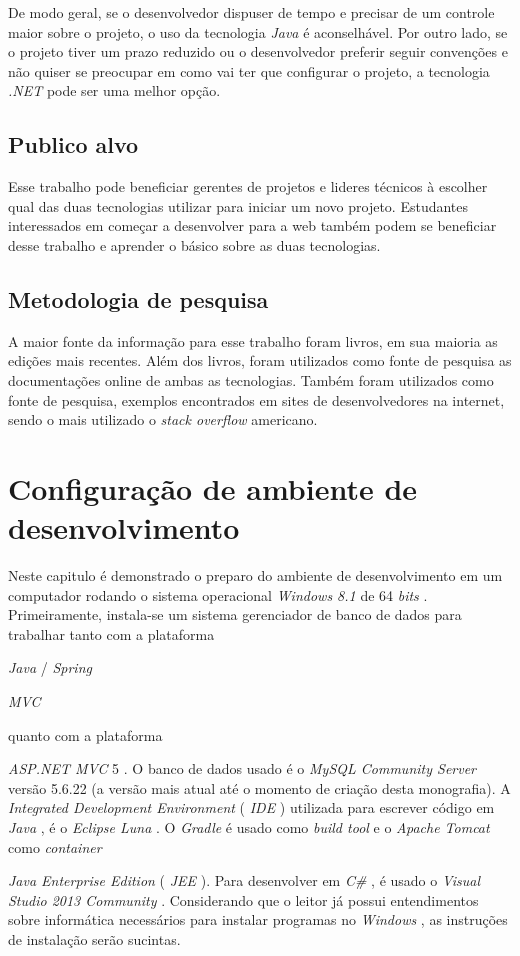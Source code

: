 \documentclass[a4paper,12pt]{article}
\newcommand{\anmvc} {
\sigla{ASP.NET MVC} 5
}
\newcommand{\spring} {
\lang{Java}/\est{Spring} \sigla{MVC}
}
\newcommand{\est}[1] {
	\textit{#1}
}
\newcommand{\sigla}[1] {
	\textit{#1}
}
\newcommand{\lang}[1] {
	\textit{#1}
}
\newcommand{\lib}[1] {
	\textit{#1}
}
\begin{document}
De modo geral, se o desenvolvedor dispuser de tempo e precisar de um controle maior sobre o projeto, o uso da tecnologia \lang{Java} é aconselhável. Por outro lado, se o projeto tiver um prazo reduzido ou o desenvolvedor preferir seguir convenções e não quiser se preocupar em como vai ter que configurar o projeto, a tecnologia \lib{.NET} pode ser uma melhor opção.
 
\subsection{Publico alvo}

Esse trabalho pode beneficiar gerentes de projetos e lideres técnicos à escolher qual das duas tecnologias utilizar para iniciar um novo projeto. Estudantes interessados em começar a desenvolver para a web também podem se beneficiar desse trabalho e aprender o básico sobre as duas tecnologias.

\subsection{Metodologia de pesquisa}

A maior fonte da informação para esse trabalho foram livros, em sua maioria as edições mais recentes. Além dos livros, foram utilizados como fonte de pesquisa as documentações online de ambas as tecnologias. Também foram utilizados como fonte de pesquisa, exemplos encontrados em sites de desenvolvedores na internet, sendo o mais utilizado o \est{stack overflow} americano.

\newpage
\section{Configuração de ambiente de desenvolvimento}

Neste capitulo é demonstrado o preparo do ambiente de desenvolvimento em um computador rodando o sistema operacional \est{Windows 8.1} de 64 \est{bits}. Primeiramente, instala-se um sistema gerenciador de banco de dados para trabalhar tanto com a plataforma \spring quanto com a plataforma \anmvc.  O banco de dados usado é o \est{MySQL Community Server} versão 5.6.22 (a versão mais atual até o momento de criação desta monografia). A \est{Integrated Development Environment} (\sigla{IDE}) utilizada  para escrever código em \lang{Java}, é o \est{Eclipse Luna}. O \est{Gradle} é usado como \est{build tool} e o \est{Apache Tomcat} como \est{container} \est{Java Enterprise Edition} (\sigla{JEE}). Para desenvolver em \lang{C\#}, é usado o \est{Visual Studio 2013 Community}. Considerando que o leitor já possui entendimentos sobre informática necessários para instalar programas no \est{Windows}, as instruções de instalação serão sucintas. 
\end{document}
